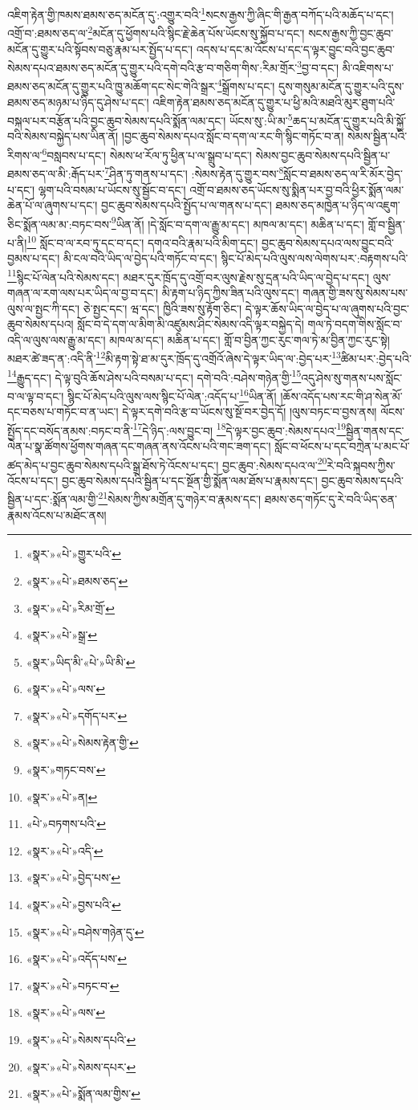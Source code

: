 འཇིག་རྟེན་གྱི་ཁམས་ཐམས་ཅད་མངོན་དུ་:འགྱུར་བའི་\footnote{«སྣར་»«པེ་»གྱུར་པའི་}སངས་རྒྱས་ཀྱི་ཞིང་གི་རྒྱན་བཀོད་པའི་མཆོད་པ་དང་། འགྲོ་བ་:ཐམས་ཅད་ལ་\footnote{«སྣར་»«པེ་»ཐམས་ཅད་}མངོན་དུ་ཕྱོགས་པའི་སྙིང་རྗེ་ཆེན་པོས་ཡོངས་སུ་སྐྱོབ་པ་དང་། སངས་རྒྱས་ཀྱི་བྱང་ཆུབ་མངོན་དུ་གྱུར་པའི་སྟོབས་བཅུ་རྣམ་པར་སྤྱོད་པ་དང་། འདས་པ་དང་མ་འོངས་པ་དང་ད་ལྟར་བྱུང་བའི་བྱང་ཆུབ་སེམས་དཔའ་ཐམས་ཅད་མངོན་དུ་གྱུར་པའི་དགེ་བའི་རྩ་བ་གཅིག་གིས་:རིམ་གྲོར་\footnote{«སྣར་»«པེ་»རིམ་གྲོ་}བྱ་བ་དང་། མི་འཇིགས་པ་ཐམས་ཅད་མངོན་དུ་གྱུར་པའི་ཁྱུ་མཆོག་དང་སེང་གེའི་སྒྲར་\footnote{«སྣར་»«པེ་»སྒྲ་}སྒྲོགས་པ་དང་། དུས་གསུམ་མངོན་དུ་གྱུར་པའི་དུས་ཐམས་ཅད་མཉམ་པ་ཉིད་དུ་ཤེས་པ་དང་། འཇིག་རྟེན་ཐམས་ཅད་མངོན་དུ་གྱུར་པ་ཕྱི་མའི་མཐའི་མུར་ཐུག་པའི་བསྐལ་པར་བརྩོན་པའི་བྱང་ཆུབ་སེམས་དཔའི་སྨོན་ལམ་དང་། ཡོངས་སུ་:ཡི་མ་\footnote{«སྣར་»ཡིད་མི་«པེ་»ཡི་མི་}ཆད་པ་མངོན་དུ་གྱུར་པའི་མི་སྐྱོ་བའི་སེམས་བསྐྱེད་པས་ཡིན་ནོ། །བྱང་ཆུབ་སེམས་དཔའ་སློང་བ་དག་ལ་རང་གི་སྙིང་གཏོང་བ་ན། སེམས་སྦྱིན་པའི་རིགས་ལ་\footnote{«སྣར་»«པེ་»ལས་}བསླབས་པ་དང་། སེམས་ཕ་རོལ་ཏུ་ཕྱིན་པ་ལ་སྒྲུབ་པ་དང་། སེམས་བྱང་ཆུབ་སེམས་དཔའི་སྦྱིན་པ་ཐམས་ཅད་ལ་མི་:རྒོད་པར་\footnote{«སྣར་»«པེ་»དགོད་པར་}ཤིན་ཏུ་གནས་པ་དང་། :སེམས་རྟེན་དུ་གྱུར་བས་\footnote{«སྣར་»«པེ་»སེམས་རྟེན་གྱི་}སློང་བ་ཐམས་ཅད་ལ་རི་མོར་བྱེད་པ་དང་། ལྷག་པའི་བསམ་པ་ཡོངས་སུ་སྦྱོང་བ་དང་། འགྲོ་བ་ཐམས་ཅད་ཡོངས་སུ་སྨིན་པར་བྱ་བའི་ཕྱིར་སྨོན་ལམ་ཆེན་པོ་ལ་ཞུགས་པ་དང་། བྱང་ཆུབ་སེམས་དཔའི་སྤྱོད་པ་ལ་གནས་པ་དང་། ཐམས་ཅད་མཁྱེན་པ་ཉིད་ལ་འཇུག་ཅིང་སྨོན་ལམ་མ་:བཏང་བས་\footnote{«སྣར་»གཏང་བས་}ཡིན་ནོ། །དེ་སློང་བ་དག་ལ་རྒྱུ་མ་དང་། མཁལ་མ་དང་། མཆིན་པ་དང་། གློ་བ་སྦྱིན་པ་ནི།\footnote{«སྣར་»«པེ་»ན།} སློང་བ་ལ་རབ་ཏུ་དང་བ་དང་། དགའ་བའི་རྣམ་པའི་མིག་དང་། བྱང་ཆུབ་སེམས་དཔའ་ལས་བྱུང་བའི་བྱམས་པ་དང་། མི་ངལ་བའི་ཡིད་ལ་བྱེད་པའི་གཏོང་བ་དང་། སྙིང་པོ་མེད་པའི་ལུས་ལས་ལེགས་པར་:བརྟགས་པའི་\footnote{«པེ་»བཏགས་པའི་}སྙིང་པོ་ལེན་པའི་སེམས་དང་། མཐར་དུར་ཁྲོད་དུ་འགྲོ་བར་ལུས་རྗེས་སུ་དྲན་པའི་ཡིད་ལ་བྱེད་པ་དང་། ལུས་གཞན་ལ་རག་ལས་པར་ཡིད་ལ་བྱ་བ་དང་། མི་རྟག་པ་ཉིད་ཀྱིས་ཟིན་པའི་ལུས་དང་། གཞན་གྱི་ཟས་སུ་སེམས་པས་ལུས་ལ་སྤྱང་ཀི་དང་། ཅེ་སྤྱང་དང་། ཝ་དང་། ཁྱིའི་ཟས་སུ་རྟོག་ཅིང་། དེ་ལྟར་ཆོས་ཡིད་ལ་བྱེད་པ་ལ་ཞུགས་པའི་བྱང་ཆུབ་སེམས་དཔའ། སློང་བ་དེ་དག་ལ་མིག་མི་འཛུམས་ཤིང་སེམས་འདི་ལྟར་བསྐྱེད་དེ། གལ་ཏེ་བདག་གིས་སློང་བ་འདི་ལ་ལུས་ལས་རྒྱུ་མ་དང་། མཁལ་མ་དང་། མཆིན་པ་དང་། གློ་བ་བྱིན་ཀྱང་རུང་གལ་ཏེ་མ་བྱིན་ཀྱང་རུང་སྟེ། མཐར་ཚེ་ཟད་ན་:འདི་ནི་\footnote{«སྣར་»«པེ་»འདི་}མི་རྟག་སྟེ་ཐ་མ་དུར་ཁྲོད་དུ་འགྲོའོ་ཞེས་དེ་ལྟར་ཡིད་ལ་:བྱེད་པར་\footnote{«སྣར་»«པེ་»བྱེད་པས་}ཚིམ་པར་:བྱེད་པའི་\footnote{«སྣར་»«པེ་»བྱས་པའི་}རྒྱུད་དང་། དེ་ལྟ་བུའི་ཆོས་ཤེས་པའི་བསམ་པ་དང་། དགེ་བའི་:བཤེས་གཉེན་གྱི་\footnote{«སྣར་»«པེ་»བཤེས་གཉེན་དུ་}འདུ་ཤེས་སུ་གནས་པས་སློང་བ་ལ་ལྟ་བ་དང་། སྙིང་པོ་མེད་པའི་ལུས་ལས་སྙིང་པོ་ལེན་:འདོད་པ་\footnote{«སྣར་»«པེ་»འདོད་པས་}ཡིན་ནོ། །ཆོས་འདོད་པས་རང་གི་ཤ་སེན་མོ་དང་བཅས་པ་གཏོང་བ་ན་ཡང་། དེ་ལྟར་དགེ་བའི་རྩ་བ་ཡོངས་སུ་སྔོ་བར་བྱེད་དོ། །ལུས་བཏང་བ་བྱས་ནས། ལོངས་སྤྱོད་དང་བསོད་ནམས་:བཏང་བ་ནི་\footnote{«སྣར་»«པེ་»བཏང་བ་}དེ་ཉིད་:ལས་བྱུང་བ། \footnote{«སྣར་»«པེ་»ལས་}དེ་ལྟར་བྱང་ཆུབ་:སེམས་དཔའ་\footnote{«སྣར་»«པེ་»སེམས་དཔའི་}སྦྱིན་གནས་དང་ལེན་པ་སྣ་ཚོགས་ཕྱོགས་གཞན་དང་གཞན་ནས་འོངས་པའི་གང་ཟག་དང་། སློང་བ་ཕོངས་པ་དང་བཀྲེན་པ་མང་པོ་ཚད་མེད་པ་བྱང་ཆུབ་སེམས་དཔའི་སྒྲ་ཐོས་ཏེ་འོངས་པ་དང་། བྱང་ཆུབ་:སེམས་དཔའ་ལ་\footnote{«སྣར་»«པེ་»སེམས་དཔར་}རེ་བའི་སྐབས་ཀྱིས་འོངས་པ་དང་། བྱང་ཆུབ་སེམས་དཔའི་སྦྱིན་པ་དང་སྔོན་གྱི་སྨོན་ལམ་ཐོས་པ་རྣམས་དང་། བྱང་ཆུབ་སེམས་དཔའི་སྦྱིན་པ་དང་:སྨོན་ལམ་གྱི་\footnote{«སྣར་»«པེ་»སྨོན་ལམ་གྱིས་}སེམས་ཀྱིས་མགྲོན་དུ་གཉེར་བ་རྣམས་དང་། ཐམས་ཅད་གཏོང་དུ་རེ་བའི་ཡིད་ཅན་རྣམས་འོངས་པ་མཐོང་ནས། 